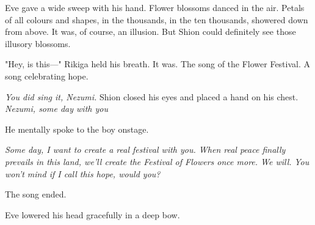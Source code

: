 Eve gave a wide sweep with his hand. Flower blossoms danced in the air. Petals of all colours and shapes, in the thousands, in the ten thousands, showered down from above. It was, of course, an illusion. But Shion could definitely see those illusory blossoms.


"Hey, is this---" Rikiga held his breath. It was. The song of the Flower Festival. A song celebrating hope.

\emph{You did sing it, Nezumi.} Shion closed his eyes and placed a hand on his chest. \emph{Nezumi, some day with you\el }

He mentally spoke to the boy onstage.

\emph{Some day, I want to create a real festival with you. When real peace finally prevails in this land, we'll create the Festival of Flowers once more. We will.}
\emph{You won't mind if I call this hope, would you?}

The song ended.

Eve lowered his head gracefully in a deep bow.
